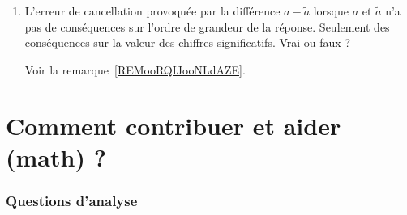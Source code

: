 \begin{enumerate}
    \item
        L'erreur de cancellation provoquée par la différence \( a-\tilde a\) lorsque \( a\) et \( \tilde a\) n'a pas de conséquences sur l'ordre de grandeur de la réponse. Seulement des conséquences sur la valeur des chiffres significatifs. Vrai ou faux ?

        Voir la remarque~\ref{REMooRQIJooNLdAZE}.
\end{enumerate}

\section{Comment contribuer et aider (math) ?}

\subsubsection{Questions d'analyse}

